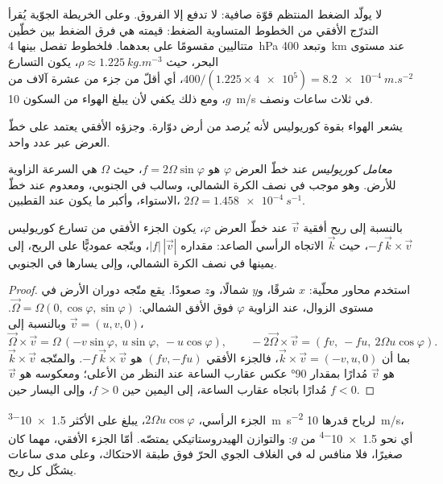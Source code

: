 لا يولّد الضغط المنتظم قوّة صافية: لا تدفع إلا الفروق. وعلى الخريطة الجوّية يُقرأ التدرّج الأفقي من الخطوط المتساوية الضغط: قيمته هي فرق الضغط بين خطّين متتاليين مقسومًا على بعدهما. فلخطوط تفصل بينها \qty{4}{hPa} وتبعد \qty{400}{km} عند مستوى البحر، حيث $\rho \approx \qty{1.225}{kg.m^{-3}}$، يكون التسارع $400/(1.225 \times \num{4e5}) = \qty{8.2e-4}{m.s^{-2}}$، أي أقلّ من جزء من عشرة آلاف من $g$، ومع ذلك يكفي لأن يبلغ الهواء من السكون \qty{10}{m/s} في ثلاث ساعات ونصف.

يشعر الهواء بقوة كوريوليس لأنه يُرصد من أرض دوّارة. وجزؤه الأفقي يعتمد على خطّ العرض عبر عدد واحد.

\begin{definition}\label{def:b1:atmospheric-circulation:coriolis-parameter}
\emph{معامل كوريوليس} عند خطّ العرض $\varphi$ هو
$f = 2\Omega\sin\varphi$، حيث $\Omega$ هي السرعة الزاوية للأرض. وهو موجب في نصف الكرة الشمالي، وسالب في الجنوبي، ومعدوم عند خطّ الاستواء، وأكبر ما يكون عند القطبين، $2\Omega = \qty{1.458e-4}{s^{-1}}$.
\end{definition}

\begin{proposition}\label{prop:b1:atmospheric-circulation:coriolis}
بالنسبة إلى ريح أفقية $\vec v$ عند خطّ العرض $\varphi$، يكون الجزء الأفقي من تسارع كوريوليس $-f\,\vec k\times\vec v$، حيث $\vec k$ الاتجاه الرأسي الصاعد: مقداره $|f|\,|\vec v|$، ويتّجه عموديًّا على الريح، إلى يمينها في نصف الكرة الشمالي، وإلى يسارها في الجنوبي.
\end{proposition}

\begin{proof}
استخدم محاور محلّية: $x$ شرقًا، و$y$ شمالًا، و$z$ صعودًا. يقع متّجه دوران الأرض في مستوى الزوال، عند الزاوية $\varphi$ فوق الأفق الشمالي: $\vec\Omega =
\Omega(0, \cos\varphi, \sin\varphi)$. وبالنسبة إلى $\vec v = (u, v, 0)$،
\[
  \vec\Omega\times\vec v = \Omega\,(-v\sin\varphi,\ u\sin\varphi,\ -u\cos\varphi),
  \qquad -2\vec\Omega\times\vec v = (f v,\ -f u,\ 2\Omega u\cos\varphi).
\]
بما أن $\vec k\times\vec v = (-v, u, 0)$، فالجزء الأفقي $(fv, -fu)$ هو
$-f\,\vec k\times\vec v$. والمتّجه $\vec k\times\vec v$ هو $\vec v$ مُدارًا بمقدار \ang{90} عكس عقارب الساعة عند النظر من الأعلى؛ ومعكوسه هو $\vec v$ مُدارًا باتجاه عقارب الساعة، إلى اليمين حين $f > 0$، وإلى اليسار حين $f < 0$.
\end{proof}

الجزء الرأسي، $2\Omega u\cos\varphi$، يبلغ على الأكثر \qty{1.5e-3}{m.s^{-2}} لرياح قدرها \qty{10}{m/s}، أي نحو \num{1.5e-4} من $g$: والتوازن الهيدروستاتيكي يمتصّه. أمّا الجزء الأفقي، مهما كان صغيرًا، فلا منافس له في الغلاف الجوي الحرّ فوق طبقة الاحتكاك، وعلى مدى ساعات يشكّل كل ريح.

